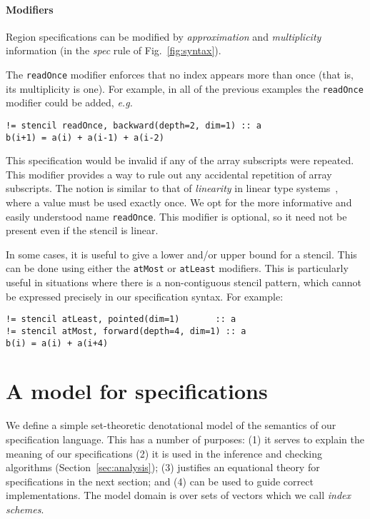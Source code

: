 \documentclass[10pt,preprint]{sigplanconf}
\theoremstyle{definition}
\newcommand{\eg}{\emph{e.g.}}
\newcommand{\term}[1]{\texttt{#1}}
\begin{document}
\paragraph{Modifiers}
Region specifications can be modified
by \emph{approximation} and \emph{multiplicity} information
(in the \textit{spec} rule of Fig.~\ref{fig:syntax}).

The \texttt{readOnce} modifier enforces that no index appears more
than once (that is, its multiplicity is one). For example, in all of
the previous examples the \texttt{readOnce} modifier could be added,
\eg{}
%
\begin{verbatim}
!= stencil readOnce, backward(depth=2, dim=1) :: a
b(i+1) = a(i) + a(i-1) + a(i-2)
\end{verbatim}
%
This specification would be invalid if any of the
array subscripts were repeated. This modifier provides a way to
rule out any accidental repetition of array subscripts.
The notion is similar to that of \emph{linearity} in linear type
systems~\cite{wadler1990linear}, where a value must be used
exactly once. We opt for the more informative and easily understood name
\texttt{readOnce}. This modifier is optional, so it need not
be present even if the stencil is linear.

In some cases, it is useful to give a lower and/or upper bound for a
stencil. This can be done using either the \term{atMost} or
\term{atLeast} modifiers. This is particularly useful in situations
where there is a non-contiguous stencil pattern, which cannot be expressed
precisely in our specification syntax. For example:
%
\begin{verbatim}
!= stencil atLeast, pointed(dim=1)       :: a
!= stencil atMost, forward(depth=4, dim=1) :: a
b(i) = a(i) + a(i+4)
\end{verbatim}

\section{A model for specifications}
\label{sec:semantics}

We define a simple set-theoretic denotational model of the semantics
of our specification language. This has a number of purposes:
(1) it serves to explain the meaning of our specifications
(2) it is used in the inference and checking algorithms
(Section~\ref{sec:analysis}); (3) justifies an equational theory for
specifications in the next section; and (4) can be used to guide
correct implementations. The model domain is over sets of vectors
which we call \emph{index schemes}.
\end{document}
